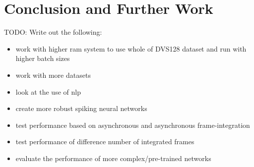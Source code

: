 \chapter{Conclusion and Further Work} \label{chap:conclusion_and_further_work}

\color{red} TODO: Write out the following:

\begin{itemize}
    \item work with higher ram system to use whole of DVS128 dataset and run with higher batch sizes
    \item work with more datasets
    \item look at the use of nlp
    \item create more robust spiking neural networks
    \item test performance based on asynchronous and asynchronous frame-integration
    \item test performance of difference number of integrated frames
    \item evaluate the performance of more complex/pre-trained networks
\end{itemize}

\color{black}